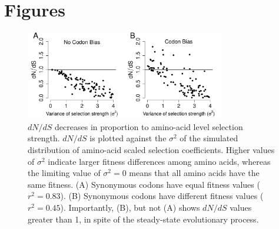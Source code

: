 \documentclass{pnastwo}
\begin{document}
	
\section*{Figures}

\vspace{2cm}
	
\begin{figure}[htbp]
	\centerline{\includegraphics[width=8.7cm]{figures/MainText/dnds_variance.pdf}}
	\caption{\label{dnds_variance} $dN/dS$ decreases in proportion to amino-acid level selection strength. $dN/dS$ is plotted against the $\sigma^2 $ of the simulated distribution of amino-acid scaled selection coefficients. Higher values of $\sigma^2$ indicate larger fitness differences among amino acids, whereas the limiting value of $\sigma^2 = 0$ means that all amino acids have the same fitness. (A) Synonymous codons have equal fitness values ($r^2=0.83$). (B) Synonymous codons have different fitness values ($r^2=0.45$). Importantly, (B), but not (A) shows $dN/dS$ values greater than 1, in spite of the steady-state evolutionary process.}
\end{figure}
		
		
\vspace{2cm}
		
\end{document}

